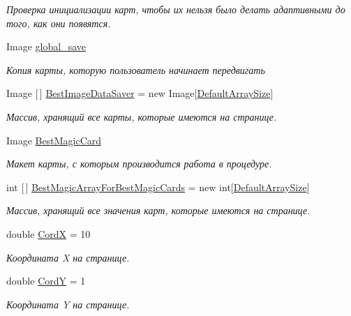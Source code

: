 \begin{DoxyCompactItemize}
\begin{DoxyCompactList}\small\item\em Проверка инициализации карт, чтобы их нельзя было делать адаптивными до того, как они появятся. \end{DoxyCompactList}\item 
Image \hyperlink{class_pasyans_cover_u_w_p_1_1_game_page_a08f63dfbfa1adc1774f5dbfaad379cde}{global\+\_\+save}
\begin{DoxyCompactList}\small\item\em Копия карты, которую пользователь начинает передвигать \end{DoxyCompactList}\item 
Image \mbox{[}$\,$\mbox{]} \hyperlink{class_pasyans_cover_u_w_p_1_1_game_page_a128b0510c61dbb4bc48f6fadffe2cbf8}{Best\+Image\+Data\+Saver} = new Image\mbox{[}\hyperlink{class_pasyans_cover_u_w_p_1_1_game_page_af512b41a55021eba0dafb53dac089916}{Default\+Array\+Size}\mbox{]}
\begin{DoxyCompactList}\small\item\em Массив, хранящий все карты, которые имеются на странице. \end{DoxyCompactList}\item 
Image \hyperlink{class_pasyans_cover_u_w_p_1_1_game_page_aff9c7aa4353b39d3d9372aaa0fa1fbb3}{Best\+Magic\+Card}
\begin{DoxyCompactList}\small\item\em Макет карты, с которым производится работа в процедуре. \end{DoxyCompactList}\item 
int \mbox{[}$\,$\mbox{]} \hyperlink{class_pasyans_cover_u_w_p_1_1_game_page_a4749dec0871a8794a50eace45a1f6db1}{Best\+Magic\+Array\+For\+Best\+Magic\+Cards} = new int\mbox{[}\hyperlink{class_pasyans_cover_u_w_p_1_1_game_page_af512b41a55021eba0dafb53dac089916}{Default\+Array\+Size}\mbox{]}
\begin{DoxyCompactList}\small\item\em Массив, хранящий все значения карт, которые имеются на странице. \end{DoxyCompactList}\item 
double \hyperlink{class_pasyans_cover_u_w_p_1_1_game_page_a80770c7db0993da166101ef31303ebce}{CordX} = 10
\begin{DoxyCompactList}\small\item\em Координата X на странице. \end{DoxyCompactList}\item 
double \hyperlink{class_pasyans_cover_u_w_p_1_1_game_page_a6a952abad53185856ccbaa26b846b6c4}{CordY} = 1
\begin{DoxyCompactList}\small\item\em Координата Y на странице. \end{DoxyCompactList}\end{DoxyCompactItemize}
